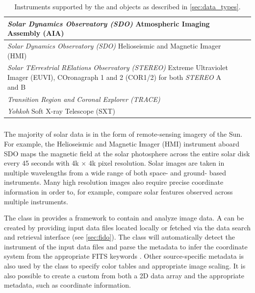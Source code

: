 \begin{table}
\begin{center}
\begin{tabular}{|p{12cm}|c|c|}
\hline
\textit{Solar Dynamics Observatory (SDO)} Atmospheric Imaging Assembly (AIA) & \citet{lemen2012} \\
\hline
\textit{Solar Dynamics Observatory (SDO)} Helioseismic and Magnetic Imager (HMI) & \citet{schou12}  \\
\hline
\textit{Solar TErrestrial RElations Observatory (STEREO)} Extreme Ultraviolet Imager (EUVI), COronagraph 1 and 2 (COR1/2) for both \textit{STEREO} A and B & \citet{howard2008sun} \\
\hline
\textit{Transition Region and Coronal Explorer (TRACE)}  & \citet{handy99}  \\
\hline
\textit{Yohkoh} Soft X-ray Telescope (SXT) & \citet{tsuneta1991soft}  \\
\hline
\end{tabular}
\end{center}
\caption{Instruments supported by the \Timeseries and \Map objects as described in \autoref{sec:data_types}.}
\label{tab:instruments}
\end{table}

\subsubsection{\Map}
\label{sec:map}
The majority of solar data is in the form of remote-sensing imagery of the Sun.
For example, the Helioseismic and Magnetic Imager (HMI) instrument aboard SDO maps the magnetic field at the solar photosphere across the entire solar disk every 45 seconds with 4k $\times$ 4k pixel resolution.
Solar images are taken in multiple wavelengths from a wide range of both space- and ground- based instruments.
Many high resolution images also require precise coordinate information in order to, for example, compare solar features observed across multiple instruments.

The \Map class in \sunpypkg provides a framework to contain and analyze image data.
A \Map can be created by providing input data files located locally or fetched via the \sunpypkg data search and retrieval interface \Fido (see \autoref{sec:fido}).
The \Map class will automatically detect the instrument of the input data files and parse the metadata to infer the coordinate system from the appropriate FITS keywords \citep{refId0, 2006A&A...449..791T}.
Other source-specific metadata is also used by the \Map class to specify color tables and appropriate image scaling.
It is also possible to create a custom \Map from both a 2D data array and the appropriate metadata, such as coordinate information.

